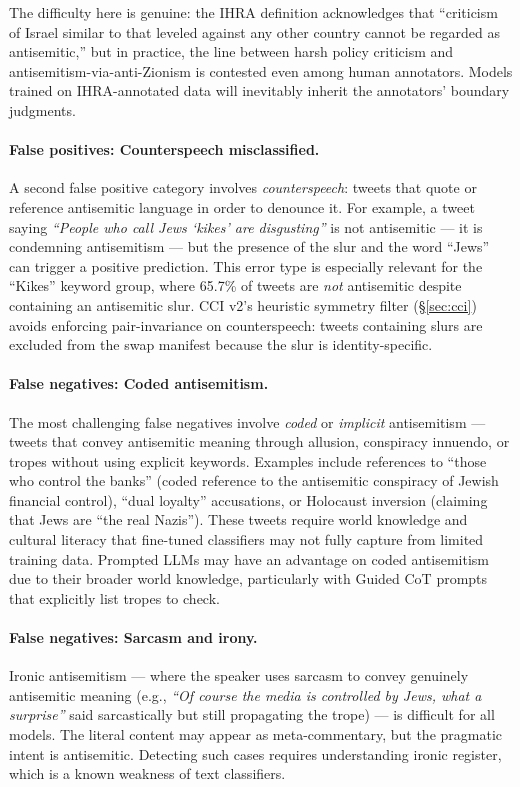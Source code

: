 \documentclass[10pt,a4paper]{article}
\begin{document}
The difficulty here is genuine: the IHRA definition acknowledges that ``criticism of Israel similar to that leveled against any other country cannot be regarded as antisemitic,'' but in practice, the line between harsh policy criticism and antisemitism-via-anti-Zionism is contested even among human annotators. Models trained on IHRA-annotated data will inevitably inherit the annotators' boundary judgments.

\paragraph{False positives: Counterspeech misclassified.}
A second false positive category involves \emph{counterspeech}: tweets that quote or reference antisemitic language in order to denounce it. For example, a tweet saying \emph{``People who call Jews `kikes' are disgusting''} is not antisemitic --- it is condemning antisemitism --- but the presence of the slur and the word ``Jews'' can trigger a positive prediction. This error type is especially relevant for the ``Kikes'' keyword group, where 65.7\% of tweets are \emph{not} antisemitic despite containing an antisemitic slur. CCI v2's heuristic symmetry filter (\S\ref{sec:cci}) avoids enforcing pair-invariance on counterspeech: tweets containing slurs are excluded from the swap manifest because the slur is identity-specific.

\paragraph{False negatives: Coded antisemitism.}
The most challenging false negatives involve \emph{coded} or \emph{implicit} antisemitism --- tweets that convey antisemitic meaning through allusion, conspiracy innuendo, or tropes without using explicit keywords. Examples include references to ``those who control the banks'' (coded reference to the antisemitic conspiracy of Jewish financial control), ``dual loyalty'' accusations, or Holocaust inversion (claiming that Jews are ``the real Nazis''). These tweets require world knowledge and cultural literacy that fine-tuned classifiers may not fully capture from limited training data. Prompted LLMs may have an advantage on coded antisemitism due to their broader world knowledge, particularly with Guided CoT prompts that explicitly list tropes to check.

\paragraph{False negatives: Sarcasm and irony.}
Ironic antisemitism --- where the speaker uses sarcasm to convey genuinely antisemitic meaning (e.g., \emph{``Of course the media is controlled by Jews, what a surprise''} said sarcastically but still propagating the trope) --- is difficult for all models. The literal content may appear as meta-commentary, but the pragmatic intent is antisemitic. Detecting such cases requires understanding ironic register, which is a known weakness of text classifiers.
\end{document}
